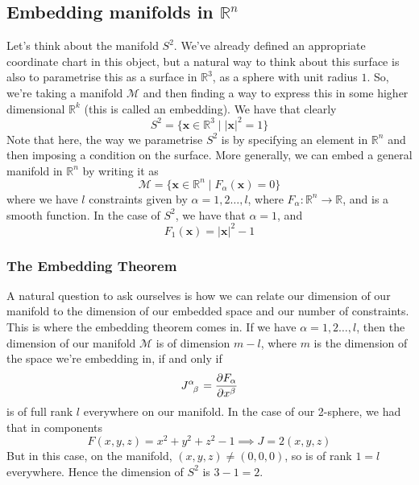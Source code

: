 \subsection{Embedding manifolds in $\mathbb{R}^n$} 
Let's think about the manifold $S^2$. We've already defined an appropriate coordinate chart in this object, but a natural way to think about this surface is also to parametrise this as a surface in $\mathbb{R}^3 $, as a sphere with unit radius $1$. So, we're taking a manifold $\mathcal{M}$ and then finding a way to express this in some higher dimensional $\mathbb{R}^k$ (this is called an embedding).  We have that clearly
\[ 	
	S^2 = \{ \mathbf{x} \in \mathbb{R}^3 \mid |\mathbf{x}|^2  =1 \} 
\] 
Note that here, the way we parametrise $S^2$ is by specifying an element in $\mathbb{R}^n$ and then imposing a condition on the surface. More generally, we can embed a general manifold in $\mathbb{R}^n$ by writing it as 
\[ 
	\mathcal{M} = \{ \mathbf{x} \in \mathbb{R}^n \mid F_\alpha(\mathbf{x} ) = 0 \}  \]
where we have $l$ constraints given by $\alpha = 1, 2 \dots, l$, where $F_\alpha : \mathbb{ R}^n \rightarrow \mathbb{R}$, and is a smooth function. In the case of $S^2$, we have that $\alpha = 1$, and 
\[ 
	F_1 ( \mathbf{x} ) = |\mathbf{x}|^2 - 1
\]  
\subsubsection{The Embedding Theorem} 
A natural question to ask ourselves is how we can relate our dimension of our manifold to the dimension of our embedded space and our number of constraints. This is where the embedding theorem comes in. If we have $\alpha = 1, 2 \dots, l$, then the dimension of our manifold $\mathcal{M}$ is of dimension $m  - l$, where $m$ is the dimension of the space we're embedding in, if and only if 
\[ 
	J\indices{^\alpha_\beta} = \frac{ \partial F_\alpha}{ \partial x^ \beta} \] 
is of full rank $l$ everywhere on our manifold.
In the case of our 2-sphere, we had that in components 
\[ 
	F(x, y, z) = x^2 + y^2 + z^2 - 1 \implies J = 2( x, y , z) 
\] 
But in this case, on the manifold, $(x, y, z) \neq ( 0 , 0 , 0)$, so is of rank $1 = l$ everywhere. Hence the dimension of $S^2$ is $3 - 1 = 2$. 
 
